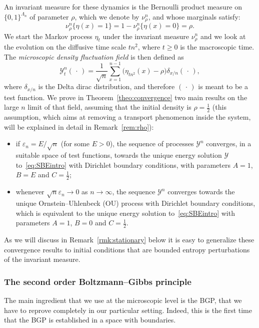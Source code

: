\documentclass[10pt]{amsart}
\theoremstyle{definition}\newtheorem{defi}[theo]{Definition}\newtheorem{rema}[theo]{Remark}\newtheorem{exam}[theo]{Example}\newtheorem{exem}[theo]{Example}\newtheorem{nota}[theo]{Notation}
\newcommand{\mc}[1]{{\mathcal #1}}
\renewcommand{\mc}[1]{{\mathcal #1}}
\renewcommand{\ge}{\geqslant}
\begin{document}
An invariant measure for these dynamics is the Bernoulli product measure on $\{0,1\}^{\Lambda_n}$ of parameter $\rho$, which we denote by $\nu_\rho^n$, and whose marginals satisfy:
\[
\nu_\rho^n\big\{\eta(x)=1\big\}=1-\nu_\rho^n\big\{\eta(x)=0\big\}=\rho.
\]
We start the Markov process $\eta_t$ under the invariant measure $\nu_\rho^n$ and we look at the evolution on the diffusive time scale $tn^2$, where $t\ge 0$ is the macroscopic time. The \emph{microscopic density fluctuation field} is then defined as
\begin{equation}\label{eq:fieldintro}
\mc Y_t^n({\,\cdot\,}) = \frac{1}{\sqrt n}\sum_{x=1}^{n-1} \big(\eta_{tn^2}(x) - \rho \big) \delta_{x /n}({\,\cdot\,}),
\end{equation}
where $\delta_{x/n}$ is the Delta dirac distribution, and therefore $({\,\cdot\,})$ is meant to be a test function. We prove in Theorem~\ref{theo:convergence} two main results on the large $n$ limit of that field, assuming that the initial density is $\rho=\frac12$ (this assumption, which aims at removing a transport phenomenon inside the system, will be explained in detail in Remark~\ref{rem:rho}):
\begin{itemize}
\item if $\varepsilon_n = E/\sqrt n$ (for some $E>0$), the sequence of processes $\mc Y^n$ converges, in a suitable space of test functions, towards the unique energy solution $\mc Y$ to~\eqref{eq:SBEintro} with Dirichlet boundary conditions, with parameters $A=1$, $B=E$ and $C=\frac12$;
\item whenever $\sqrt n\varepsilon_n \to 0$ as $n\to \infty$, the sequence $\mc Y^n$ converges towards the unique Ornstein--Uhlenbeck (OU) process with Dirichlet boundary conditions, which is equivalent to the unique energy solution to~\eqref{eq:SBEintro} with parameters $A=1$, $B=0$ and $C=\frac12$.
\end{itemize}

As we will discuss in Remark~\ref{rmk:stationary} below it is easy to generalize these convergence results to initial conditions that are bounded entropy perturbations of the invariant measure.


\subsubsection{The second order Boltzmann--Gibbs principle} The main ingredient that we use at the microscopic level is the BGP, that we have to reprove completely in our particular setting. Indeed, this is the first time that the BGP is established in a space with boundaries.
\end{document}

